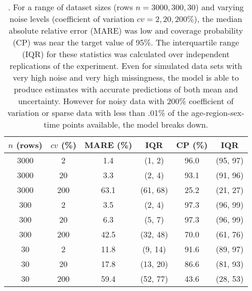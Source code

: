 \begin{table}
\begin{center}
\begin{tabular}{|cc|cc|cc|}
\hline
$n$ (rows)      &       $cv$ (\%)            &       MARE (\%)       &       IQR     &       CP (\%) &       IQR\\
\hline
\hline
3000    &       2            &       1.4     &       (1, 2)  &      96.0     &       (95, 97)\\
3000    &       20           &       3.3     &       (2, 4)  &      93.1     &       (91, 96)\\
3000    &       200          &       63.1    &       (61, 68)       &
        25.2    &       (21, 27)\\
300     &       2            &       3.5     &       (2, 4)  &      97.3     &       (96, 99)\\
300     &       20           &       6.3     &       (5, 7)  &      97.3     &       (96, 99)\\
300     &       200          &       42.5    &       (32, 48)       &
        70.0    &       (61, 76)\\
30      &       2            &       11.8    &       (9, 14) &      91.6     &       (89, 97)\\
30      &       20           &       17.8    &       (13, 20)       &
        86.6    &       (81, 93)\\
30      &       200          &       59.4    &       (52, 77)       &
        43.6    &       (28, 53)\\
\hline
\end{tabular}
\end{center}
\caption{.  For a range
  of dataset sizes (rows $n = 3000, 300, 30$) and varying noise levels
  (coefficient of variation $cv=2, 20, 200\%$), the median absolute
  relative error (MARE) was low and coverage probability (CP) was near
  the target value of 95\%.  The interquartile range (IQR) for these
  statistics was calculated over  independent
  replications of the experiment. Even for simulated data sets with
  very high noise and very high missingness, the model is able to
  produce estimates with accurate predictions of both mean and
  uncertainty.  However for noisy data with 200\% coefficient of
  variation or sparse data with less than .01\% of the
  age-region-sex-time points available, the model breaks down.}
\label{table:sim-results}
\end{table}


